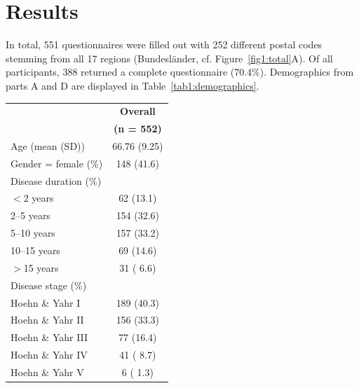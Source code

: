 \documentclass{bmcart}
\begin{document}
\section*{Results}
In total, 551 questionnaires were filled out with 252 different postal codes stemming from all 17 regions (Bundesländer, cf. Figure~\ref{fig1:total}A). Of all participants, 388 returned a complete questionnaire (70.4$\%$). Demographics from parts A and D are displayed in Table~\ref{tab1:demographics}. 

\begin{table}[!ht]
\begin{tabular}{p{5cm} c}
\toprule
																	&	\textbf{Overall}	\\ %
																	& 	\textbf{(n = 552)}\\ 
\midrule
Age (mean (SD)) 															& 	66.76 (9.25) 	\\ \hline
Gender = female (\%) 														&  	148 (41.6)  		\\ \hline
Disease duration (\%) 														& 				\\ \hline
\hspace{3mm} $<$2 years 													& 	62 (13.1) 		\\ \hline
\hspace{3mm} 2--5 years 													& 	154 (32.6) 		\\ \hline
\hspace{3mm} 5--10 years 													& 	157 (33.2) 		\\ \hline
\hspace{3mm} 10--15 years 													& 	69 (14.6) 		\\ \hline
\hspace{3mm} $>$15 years													& 	31 ( 6.6) 		\\ \hline
Disease stage (\%)														& 				\\ \hline
\hspace{3mm} Hoehn \& Yahr I 												&  	189 (40.3) 		\\ \hline
\hspace{3mm} Hoehn \& Yahr II 												& 	156 (33.3)  		\\ \hline
\hspace{3mm} Hoehn \& Yahr III  												&   	77 (16.4) 		\\ \hline
\hspace{3mm} Hoehn \& Yahr IV  												& 	41 ( 8.7) 		\\ \hline
\hspace{3mm} Hoehn \& Yahr V  												&     	6 ( 1.3) 		\\ \hline

\end{tabular}
\end{table}
\end{document}
